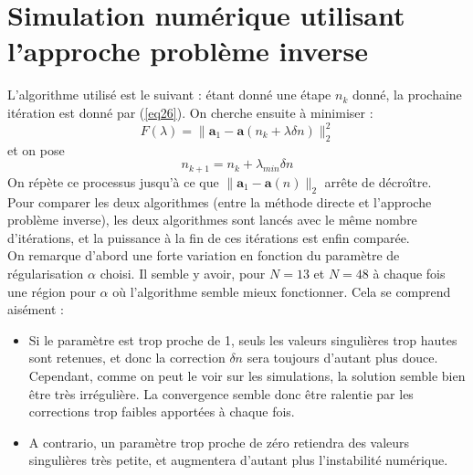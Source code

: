 \documentclass{article}
\begin{document}
\section{Simulation numérique utilisant l'approche problème inverse}
L'algorithme utilisé est le suivant : étant donné une étape $n_k$ donné, la prochaine itération est donné par (\ref{eq26}). On cherche ensuite à minimiser :
	\[F(\lambda)=\|\mathbf{a}_1-\mathbf{a}(n_k+\lambda\delta n)\|_2^2\]
et on pose
	\[n_{k+1}=n_k+\lambda_{min}\delta n\]
On répète ce processus jusqu'à ce que $\|\mathbf{a}_1-\mathbf{a}(n)\|_2$ arrête de décroître.\\
Pour comparer les deux algorithmes (entre la méthode directe et l'approche problème inverse), les deux algorithmes sont lancés avec le même nombre d'itérations, et la puissance à la fin de ces itérations est enfin comparée.\\
On remarque d'abord une forte variation en fonction du paramètre de régularisation $\alpha$ choisi. Il semble y avoir, pour $N=13$ et $N=48$ à chaque fois une région pour $\alpha$ où l'algorithme semble mieux fonctionner. Cela se comprend aisément :
\begin{itemize}
	\item Si le paramètre est trop proche de 1, seuls les valeurs singulières trop hautes sont retenues, et donc la correction $\delta n$ sera toujours d'autant plus douce. Cependant, comme on peut le voir sur les simulations, la solution semble bien être très irrégulière. La convergence semble donc être ralentie par les corrections trop faibles apportées à chaque fois.
	\item A contrario, un paramètre trop proche de zéro retiendra des valeurs singulières très petite, et augmentera d'autant plus l'instabilité numérique.
\end{itemize}
\end{document}
